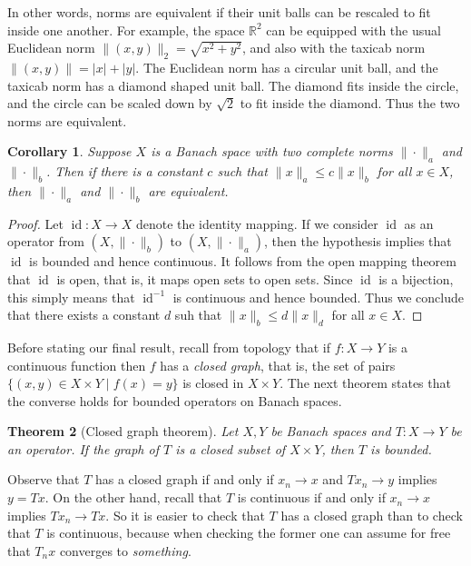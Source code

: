 \documentclass[11pt,oneside]{amsbook}
\newcommand{\RR}{{\mathbb R}}
\DeclareMathOperator{\id}{id}
\theoremstyle{definition}
\theoremstyle{plain}
\newtheorem{thm}{Theorem}[section]
\newtheorem{cor}[thm]{Corollary}
\theoremstyle{definition}
\theoremstyle{remark}
\numberwithin{equation}{section}
\numberwithin{figure}{section}
\begin{document}
In other words, norms are equivalent if their unit balls can be rescaled to fit inside one another. For example, the space $\RR^2$ can be equipped with the usual Euclidean norm $\|(x,y)\|_2=\sqrt{x^2+y^2}$, and also with the taxicab norm $\|(x,y)\|=|x|+|y|$. The Euclidean norm has a circular unit ball, and the taxicab norm has a diamond shaped unit ball. The diamond fits inside the circle, and the circle can be scaled down by $\sqrt2$ to fit inside the diamond. Thus the two norms are equivalent.

\begin{cor}
  \label{cor:norm-equiv}
  Suppose $X$ is a Banach space with two complete norms $\|\cdot\|_a$ and $\|\cdot\|_b$. Then if there is a constant $c$ such that $\|x\|_a\leq c\|x\|_b$ for all $x\in X$, then $\|\cdot\|_a$ and $\|\cdot\|_b$ are equivalent.
\end{cor}

\begin{proof}
  Let $\id\colon X\to X$ denote the identity mapping. If we consider $\id$ as an operator from $(X,\|\cdot\|_b)$ to $(X,\|\cdot\|_a)$, then the hypothesis implies that $\id$ is bounded and hence continuous. It follows from the open mapping theorem that $\id$ is open, that is, it maps open sets to open sets. Since $\id$ is a bijection, this simply means that $\id^{-1}$ is continuous and hence bounded. Thus we conclude that there exists a constant $d$ suh that $\|x\|_b\leq d\|x\|_d$ for all $x\in X$.
\end{proof}

Before stating our final result, recall from topology that if $f\colon X\to Y$ is a continuous function then $f$ has a \emph{closed graph}, that is, the set of pairs $\{(x,y)\in X\times Y\mid f(x)=y\}$ is closed in $X\times Y$. The next theorem states that the converse holds for bounded operators on Banach spaces.

\begin{thm}[Closed graph theorem]
  Let $X,Y$ be Banach spaces and $T\colon X\to Y$ be an operator. If the graph of $T$ is a closed subset of $X\times Y$, then $T$ is bounded.
\end{thm}

Observe that $T$ has a closed graph if and only if $x_n\to x$ and $Tx_n\to y$ implies $y=Tx$. On the other hand, recall that $T$ is continuous if and only if $x_n\to x$ implies $Tx_n\to Tx$.  So it is easier to check that $T$ has a closed graph than to check that $T$ is continuous, because when checking the former one can assume for free that $T_nx$ converges to \emph{something}.
\end{document}
